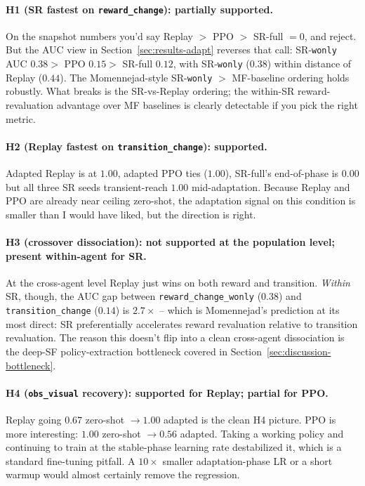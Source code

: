 \documentclass{article}
\begin{document}
\paragraph{H1 (SR fastest on \texttt{reward\_change}): partially supported.} On the snapshot numbers you'd say Replay $>$ PPO $>$ SR-full $=0$, and reject. But the AUC view in Section~\ref{sec:results-adapt} reverses that call: SR-\texttt{wonly} AUC $0.38 >$ PPO $0.15 >$ SR-full $0.12$, with SR-\texttt{wonly} ($0.38$) within distance of Replay ($0.44$). The Momennejad-style SR-\texttt{wonly} $>$ MF-baseline ordering holds robustly. What breaks is the SR-vs-Replay ordering; the within-SR reward-revaluation advantage over MF baselines is clearly detectable if you pick the right metric.

\paragraph{H2 (Replay fastest on \texttt{transition\_change}): supported.} Adapted Replay is at $1.00$, adapted PPO ties ($1.00$), SR-full's end-of-phase is $0.00$ but all three SR seeds transient-reach $1.00$ mid-adaptation. Because Replay and PPO are already near ceiling zero-shot, the adaptation signal on this condition is smaller than I would have liked, but the direction is right.

\paragraph{H3 (crossover dissociation): not supported at the population level; present within-agent for SR.} At the cross-agent level Replay just wins on both reward and transition. \emph{Within} SR, though, the AUC gap between \texttt{reward\_change\_wonly} ($0.38$) and \texttt{transition\_change} ($0.14$) is $2.7\times$ -- which is Momennejad's prediction at its most direct: SR preferentially accelerates reward revaluation relative to transition revaluation. The reason this doesn't flip into a clean cross-agent dissociation is the deep-SF policy-extraction bottleneck covered in Section~\ref{sec:discussion-bottleneck}.

\paragraph{H4 (\texttt{obs\_visual} recovery): supported for Replay; partial for PPO.} Replay going $0.67$ zero-shot $\rightarrow 1.00$ adapted is the clean H4 picture. PPO is more interesting: $1.00$ zero-shot $\rightarrow 0.56$ adapted. Taking a working policy and continuing to train at the stable-phase learning rate destabilized it, which is a standard fine-tuning pitfall. A $10\times$ smaller adaptation-phase LR or a short warmup would almost certainly remove the regression.
\end{document}
